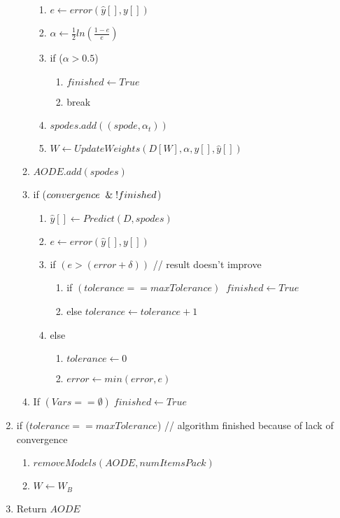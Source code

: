 \begin{enumerate}
\begin{enumerate}
\begin{enumerate}
        \item $e \leftarrow error(\hat{y}[], y[])$
        \item $\alpha \leftarrow \frac{1}{2} ln \left ( \frac{1-e}{e} \right )$
        \item if ($\alpha > 0.5$)
        \begin{enumerate}
            \item $finished \leftarrow True$
            \item break
        \end{enumerate}
        \item $spodes.add( (spode,\alpha_t) )$
        \item $W \leftarrow UpdateWeights(D[W],\alpha,y[],\hat{y}[])$
    \end{enumerate}       
    \item $AODE.add( spodes )$
    \item if ($convergence \And ! finished$) 
    \begin{enumerate}       
        \item $\hat{y}[] \leftarrow Predict(D,spodes)$
        \item $e \leftarrow error(\hat{y}[], y[])$
        \item if $(e > (error+\delta))$ \hspace*{2cm} // result doesn't improve
        \begin{enumerate}
            \item if $(tolerance == maxTolerance) \;\; finished\leftarrow True$
            \item else $tolerance \leftarrow tolerance+1$
        \end{enumerate}
        \item else
        \begin{enumerate}
            \item $tolerance \leftarrow 0$
            \item $error \leftarrow min(error,e)$
         \end{enumerate}
    \end{enumerate}
    \item If $(Vars == \emptyset) \; finished \leftarrow True$

\end{enumerate}
\item if ($tolerance == maxTolerance$) // algorithm finished because of lack of convergence
\begin{enumerate}
    \item $removeModels(AODE, numItemsPack)$
    \item $W \leftarrow W_B$
\end{enumerate}
\item Return $AODE$
\end{enumerate}